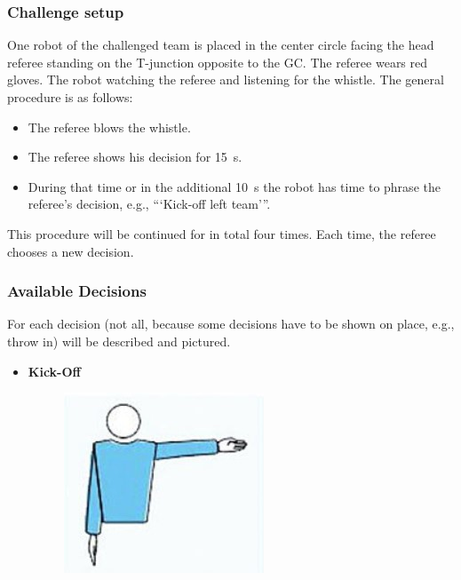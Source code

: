     \subsubsection{Challenge setup}

        One robot of the challenged team is placed in the center circle facing the head referee standing on the T-junction opposite to the GC. The referee wears red gloves. The robot watching the referee and listening for the whistle. The general procedure is as follows:

        \begin{itemize}
            \item The referee blows the whistle.
            \item The referee shows his decision for \qty{15}{\second}.
            \item During that time or in the additional \qty{10}{\second} the robot has time to phrase the referee's decision, e.g., ```Kick-off left team'''. 
        \end{itemize}

        This procedure will be continued for in total four times. Each time, the referee chooses a new decision.

    \subsubsection{Available Decisions}

        For each decision (not all, because some decisions have to be shown on place, e.g., throw in) will be described and pictured.

        \begin{itemize}
            \item \textbf{Kick-Off}
            \begin{figure}[ht!]
                \includegraphics{figs/kick-off_referee.jpg}
            \end{figure}
        \end{itemize}

